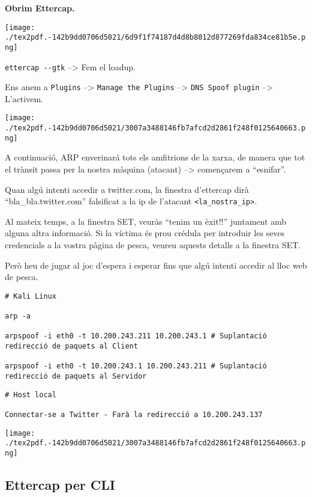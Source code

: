 \documentclass[]{article}
\begin{document}
\textbf{Obrim Ettercap.}

\texttt{[image: ./tex2pdf.-142b9dd0706d5021/6d9f1f74187d4d8b8012d877269fda834ce81b5e.png]}

\texttt{ettercap\ -\/-gtk} --\textgreater{} Fem el loadup.

Ens anem a \texttt{Plugins} --\textgreater{}
\texttt{Manage\ the\ Plugins} --\textgreater{}
\texttt{DNS\ Spoof\ plugin} --\textgreater{} L'activem.

\texttt{[image: ./tex2pdf.-142b9dd0706d5021/3007a3488146fb7afcd2d2861f248f0125640663.png]}

A continuació, ARP enverinará tots els amfitrions de la xarxa, de manera
que tot el trànsit passa per la nostra màquina (atacant)
--\textgreater{} començarem a ``esnifar''.

Quan algú intenti accedir a twitter.com, la finestra d'ettercap dirà
``bla\_bla.twitter.com'' falsificat a la ip de l'atacant
\texttt{\textless{}la\_nostra\_ip\textgreater{}}.

Al mateix temps, a la finestra SET, veuràs ``tenim un èxit!!'' juntament
amb alguna altra informació. Si la víctima és prou crédula per introduir
les seves credencials a la vostra pàgina de pesca, veureu aquests
detalls a la finestra SET.

Però heu de jugar al joc d'espera i esperar fins que algú intenti
accedir al lloc web de pesca.

\begin{verbatim}
# Kali Linux

arp -a

arpspoof -i eth0 -t 10.200.243.211 10.200.243.1 # Suplantació redirecció de paquets al Client

arpspoof -i eth0 -t 10.200.243.1 10.200.243.211 # Suplantació redirecció de paquets al Servidor
\end{verbatim}

\begin{verbatim}
# Host local

Connectar-se a Twitter - Farà la redirecció a 10.200.243.137

\end{verbatim}

\texttt{[image: ./tex2pdf.-142b9dd0706d5021/3007a3488146fb7afcd2d2861f248f0125640663.png]}

\hypertarget{ettercap-per-cli}{%
\subsection{\texorpdfstring{\textbf{Ettercap per
CLI}}{Ettercap per CLI}}\label{ettercap-per-cli}}
\end{document}
